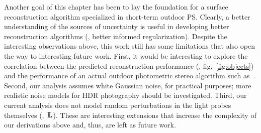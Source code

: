 Another goal of this chapter has been to lay the foundation for a surface reconstruction algorithm specialized in short-term outdoor PS. Clearly, a better understanding of the sources of uncertainty is useful in developing better reconstruction algorithms (\eg, better informed regularization). Despite the interesting observations above, this work still has some limitations that also open the way to interesting future work. First, it would be interesting to explore the correlation between the predicted reconstruction performance (\eg, fig.~\ref{fig:objects}) and the performance of an actual outdoor photometric stereo algorithm such as~\cite{yu-iccp-13}. Second, our analysis assumes white Gaussian noise, for practical purposes; more realistic noise models for HDR photography should be investigated. Third, our current analysis does not model random perturbations in the light probes themselves (\ie,~${\bf L}$). These are interesting extensions that increase the complexity of our derivations above and, thus, are left as future work. %








